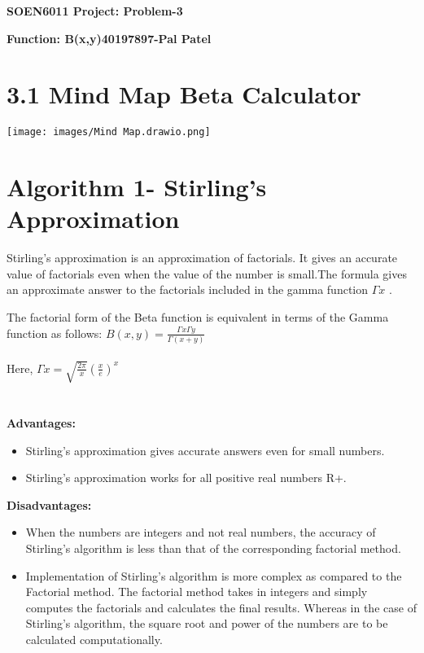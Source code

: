 \documentclass{report}
\begin{document}
\begin{center}\Large\textbf{SOEN6011 Project: Problem-3}\end{center}
\begin{center}\author{Pal Patel}\end{center}

\begin{flushleft}\Large\textbf{Function: B(x,y)}\hfill\textbf{40197897-Pal Patel}\end{flushleft}

\section*{3.1 Mind Map Beta Calculator}
\begin{center}
   \texttt{[image: images/Mind Map.drawio.png]}
\end{center}

\section*{Algorithm 1- Stirling's Approximation}

Stirling's approximation is an approximation of factorials. It gives an accurate value of factorials even when the value of the number is small.The formula gives an approximate answer to the factorials included in the gamma function $\Gamma x$ \cite{stirling}. 

The factorial form of the Beta function is equivalent in terms of the Gamma function as follows:
$B(x,y)=\frac{\Gamma x \Gamma y}{\Gamma (x+y)}$\\
\\
Here, $\Gamma x = \sqrt{\frac{2 \pi}{x}}(\frac{x}{e})^x$\\
\\
\\

\textbf{Advantages:}
\begin{itemize}
    \item Stirling's approximation gives accurate answers even for small numbers.
    \item Stirling's approximation works for all positive real numbers R+.
\end{itemize}

\textbf{Disadvantages:}
\begin{itemize}
    \item When the numbers are integers and not real numbers, the accuracy of Stirling's algorithm is less than that of the corresponding factorial method.
    \item Implementation of Stirling's algorithm is more complex as compared to the Factorial method. The factorial method takes in integers and simply computes the factorials and calculates the final results. Whereas in the case of Stirling's algorithm, the square root and power of the numbers are to be calculated computationally. 
\end{itemize}
\end{document}
